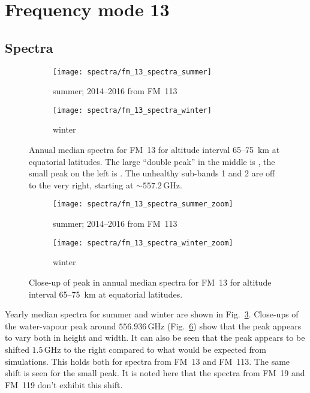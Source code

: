 \section{Frequency mode 13}
\label{FM13}

\subsection{Spectra}
\label{FM13:spectra}

\begin{figure}[ht]
    \centering
    \begin{subfigure}[b]{0.9545\textwidth}
        \texttt{[image: spectra/fm\_13\_spectra\_summer]}
        \caption{summer; 2014--2016 from FM~113}\label{fig:spectra:13:summer}
    \end{subfigure}
    \begin{subfigure}[b]{0.9545\textwidth}
        \texttt{[image: spectra/fm\_13\_spectra\_winter]}
        \caption{winter}\label{fig:spectra:13:winter}
    \end{subfigure}
    \caption{Annual median spectra for FM~13 for altitude interval 65--75~km at
        equatorial latitudes. The large ``double peak'' in the middle is
        , the small peak on the left is . The unhealthy
        sub-bands 1 and 2 are off to the very right, starting at
        $\sim557.2\,\mathrm{GHz}$.}\label{fig:spectra:13}
\end{figure}

\begin{figure}[ht]
    \centering
    \begin{subfigure}[b]{0.9545\textwidth}
        \texttt{[image: spectra/fm\_13\_spectra\_summer\_zoom]}
        \caption{summer; 2014--2016 from
            FM~113}\label{fig:spectra:13:summer:closeup}
    \end{subfigure}
    \begin{subfigure}[b]{0.9545\textwidth}
        \texttt{[image: spectra/fm\_13\_spectra\_winter\_zoom]}
        \caption{winter}\label{fig:spectra:13:winter:closeup}
    \end{subfigure}
    \caption{Close-up of  peak in annual median spectra for
        FM~13 for altitude interval 65--75~km at equatorial latitudes.
        }\label{fig:spectra:13:closeup}
\end{figure}

\noindent
Yearly median spectra for summer and winter are shown in
Fig.~\ref{fig:spectra:13}. Close-ups of the water-vapour peak around
$556.936\,\mathrm{GHz}$ (Fig.~\ref{fig:spectra:13:closeup}) show that the peak
appears to vary both in height and width. It can also be seen that the peak
appears to be shifted $1.5\,\mathrm{GHz}$ to the right compared to what would
be expected from simulations. This holds both for spectra from FM~13 and
FM~113. The same shift is seen for the small  peak. It is noted here
that the spectra from FM~19 and FM~119 don't exhibit this shift.


